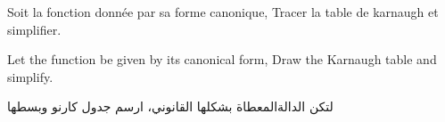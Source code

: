 Soit la fonction donnée par sa forme canonique, Tracer la table de karnaugh et simplifier.


Let the function be given by its canonical form, Draw the Karnaugh table and simplify.


لتكن الدالةالمعطاة بشكلها القانوني، ارسم جدول كارنو وبسطها
